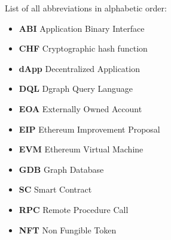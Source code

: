 
List of all abbreviations in alphabetic order:

\begin{itemize}
    \item \textbf{ABI} Application Binary Interface
    \item \textbf{CHF} Cryptographic hash function
    \item \textbf{dApp} Decentralized Application
    \item \textbf{DQL} Dgraph Query Language
    \item \textbf{EOA} Externally Owned Account
    \item \textbf{EIP} Ethereum Improvement Proposal
    \item \textbf{EVM} Ethereum Virtual Machine
    \item \textbf{GDB} Graph Database
    \item \textbf{SC} Smart Contract
    \item \textbf{RPC} Remote Procedure Call
    \item \textbf{NFT} Non Fungible Token
\end{itemize}